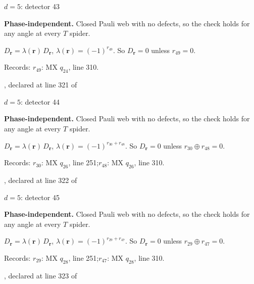\label{d5_det043}
{\Large $d=5$: detector 43}\par
\textbf{Phase-independent.} Closed Pauli web with no defects, so the check holds for any angle at every $T$ spider.
\begin{center}
\end{center}
\vspace{-1mm}
$D_{\boldsymbol r}=\lambda(\boldsymbol r)\,D_{\boldsymbol r}$, \quad $\lambda(\boldsymbol r)=(-1)^{r_{49}}$. \qquad So $D_{\boldsymbol r}=0$ unless $r_{49}=0$.
\par\smallskip\begin{minipage}{.98\linewidth}\small Records: $r_{49}$: MX $q_{24}$, line 310.\end{minipage}
\vfill
{\footnotesize\texttt{}, declared at line 321 of \texttt{}}
\newpage

\label{d5_det044}
{\Large $d=5$: detector 44}\par
\textbf{Phase-independent.} Closed Pauli web with no defects, so the check holds for any angle at every $T$ spider.
\begin{center}
\end{center}
\vspace{-1mm}
$D_{\boldsymbol r}=\lambda(\boldsymbol r)\,D_{\boldsymbol r}$, \quad $\lambda(\boldsymbol r)=(-1)^{r_{30}+r_{48}}$. \qquad So $D_{\boldsymbol r}=0$ unless $r_{30}\oplus r_{48}=0$.
\par\smallskip\begin{minipage}{.98\linewidth}\small Records: $r_{30}$: MX $q_{26}$, line 251;\quad $r_{48}$: MX $q_{26}$, line 310.\end{minipage}
\vfill
{\footnotesize\texttt{}, declared at line 322 of \texttt{}}
\newpage

\label{d5_det045}
{\Large $d=5$: detector 45}\par
\textbf{Phase-independent.} Closed Pauli web with no defects, so the check holds for any angle at every $T$ spider.
\begin{center}
\end{center}
\vspace{-1mm}
$D_{\boldsymbol r}=\lambda(\boldsymbol r)\,D_{\boldsymbol r}$, \quad $\lambda(\boldsymbol r)=(-1)^{r_{29}+r_{47}}$. \qquad So $D_{\boldsymbol r}=0$ unless $r_{29}\oplus r_{47}=0$.
\par\smallskip\begin{minipage}{.98\linewidth}\small Records: $r_{29}$: MX $q_{28}$, line 251;\quad $r_{47}$: MX $q_{28}$, line 310.\end{minipage}
\vfill
{\footnotesize\texttt{}, declared at line 323 of \texttt{}}
\newpage

